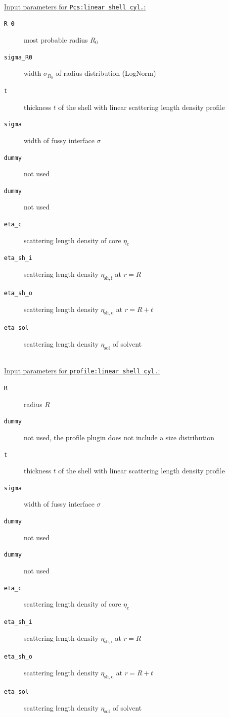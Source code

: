 \vspace{1mm}

\hspace{1pt}\\
\underline{Input parameters for \texttt{Pcs:linear shell cyl.}:}
\begin{description}
    \item[\texttt{R\_0}] most probable radius $R_0$
    \item[\texttt{sigma\_R0}] width $\sigma_{R_0}$ of radius distribution (LogNorm)
    \item[\texttt{t}] thickness $t$ of the shell with linear scattering length density profile
    \item[\texttt{sigma}] width of fussy interface $\sigma$
    \item[\texttt{dummy}] not used
    \item[\texttt{dummy}] not used
    \item[\texttt{eta\_c}] scattering length density of core $\eta_\mathrm{c}$
    \item[\texttt{eta\_sh\_i}] scattering length density $\eta_\mathrm{sh,i}$ at $r=R$
    \item[\texttt{eta\_sh\_o}] scattering length density $\eta_\mathrm{sh,o}$ at $r=R+t$
    \item[\texttt{eta\_sol}] scattering length density $\eta_\mathrm{sol}$ of solvent
\end{description}

\hspace{1pt}\\
\underline{Input parameters for \texttt{profile:linear shell cyl.}:}
\begin{description}
    \item[\texttt{R}] radius $R$
    \item[\texttt{dummy}] not used, the profile plugin does not include a size distribution
    \item[\texttt{t}] thickness $t$ of the shell with linear scattering length density profile
    \item[\texttt{sigma}] width of fussy interface $\sigma$
    \item[\texttt{dummy}] not used
    \item[\texttt{dummy}] not used
    \item[\texttt{eta\_c}] scattering length density of core $\eta_\mathrm{c}$
    \item[\texttt{eta\_sh\_i}] scattering length density $\eta_\mathrm{sh,i}$ at $r=R$
    \item[\texttt{eta\_sh\_o}] scattering length density $\eta_\mathrm{sh,o}$ at $r=R+t$
    \item[\texttt{eta\_sol}] scattering length density $\eta_\mathrm{sol}$ of solvent
\end{description}

